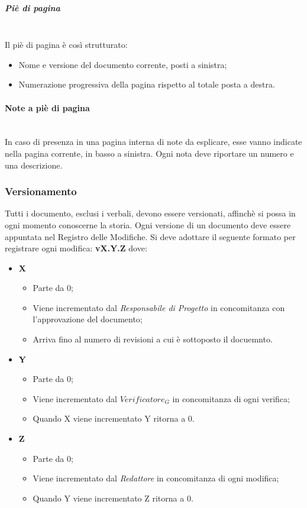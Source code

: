 			\subparagraph{Piè di pagina} \mbox{} \\
			Il piè di pagina è così strutturato:
			\begin{itemize}
				\item Nome e versione del documento corrente, posti a sinistra;
				\item Numerazione progressiva della pagina rispetto al totale posta a destra.
			\end{itemize}
		
		\paragraph{Note a piè di pagina} \mbox{} \\
		In caso di presenza in una pagina interna di note da esplicare, esse vanno indicate nella pagina corrente, in basso a sinistra. Ogni nota deve riportare un numero e una	descrizione.
		
	\subsubsection{Versionamento}
	Tutti i documento, esclusi i verbali, devono essere versionati, affinchè si possa in ogni momento conoscerne la storia. Ogni versione di un documento deve essere appuntata nel Registro delle Modifiche. Si deve adottare il seguente formato per registrare ogni modifica: 
	\textbf{v{X}.{Y}.{Z}}
	dove:
	\begin{itemize}
		\item \textbf{X}
		\begin{itemize}
			\item Parte da 0;
			\item Viene incrementato dal \textit{Responsabile di Progetto} in concomitanza con l'approvazione del documento;
			\item Arriva fino al numero di revisioni a cui è sottoposto il docuemnto.
		\end{itemize}
		
		\item \textbf{Y}
		\begin{itemize}
			\item Parte da 0;
			\item Viene incrementato dal \textit{$Verificatore_G$} in concomitanza di ogni verifica;
			\item Quando X viene incrementato Y ritorna a 0.
		\end{itemize}
		
		\item \textbf{Z}
		\begin{itemize}
			\item Parte da 0;
			\item Viene incrementato dal \textit{Redattore} in concomitanza di ogni modifica;
			\item Quando Y viene incrementato Z	 ritorna a 0.
		\end{itemize}
		
	\end{itemize}
	
